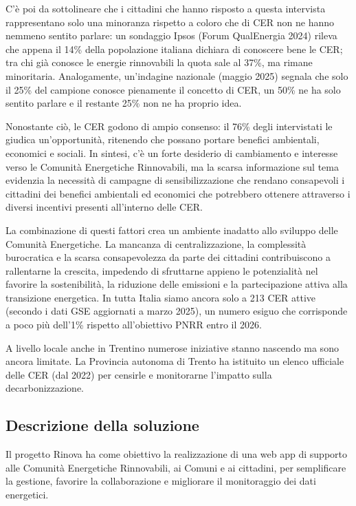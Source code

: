 C’è poi da sottolineare che i cittadini che hanno risposto a questa intervista rappresentano solo una minoranza rispetto a coloro che di CER non ne hanno nemmeno sentito parlare: un sondaggio Ipsos (Forum QualEnergia 2024) rileva che appena il 14\% della popolazione italiana dichiara di conoscere bene le CER; tra chi già conosce le energie rinnovabili la quota sale al 37\%, ma rimane minoritaria. Analogamente, un’indagine nazionale (maggio 2025) segnala che solo il 25\% del campione conosce pienamente il concetto di CER, un 50\% ne ha solo sentito parlare e il restante 25\% non ne ha proprio idea.

Nonostante ciò, le CER godono di ampio consenso: il 76\% degli intervistati le giudica un’opportunità, ritenendo che possano portare benefici ambientali, economici e sociali. In sintesi, c’è un forte desiderio di cambiamento e interesse verso le Comunità Energetiche Rinnovabili, ma la scarsa informazione sul tema evidenzia la necessità di campagne di sensibilizzazione che rendano consapevoli i cittadini dei benefici ambientali ed economici che potrebbero ottenere attraverso i diversi incentivi presenti all’interno delle CER.

La combinazione di questi fattori crea un ambiente inadatto allo sviluppo delle Comunità Energetiche. La mancanza di centralizzazione, la complessità burocratica e la scarsa consapevolezza da parte dei cittadini contribuiscono a rallentarne la crescita, impedendo di sfruttarne appieno le potenzialità nel favorire la sostenibilità, la riduzione delle emissioni e la partecipazione attiva alla transizione energetica. In tutta Italia siamo ancora solo a 213 CER attive (secondo i dati GSE aggiornati a marzo 2025), un numero esiguo che corrisponde a poco più dell’1\% rispetto all’obiettivo PNRR entro il 2026.

A livello locale anche in Trentino numerose iniziative stanno nascendo ma sono ancora limitate. La Provincia autonoma di Trento ha istituito un elenco ufficiale delle CER (dal 2022) per censirle e monitorarne l’impatto sulla decarbonizzazione.

\subsection{Descrizione della soluzione}
Il progetto Rinova ha come obiettivo la realizzazione di una web app di supporto alle Comunità Energetiche Rinnovabili, ai Comuni e ai cittadini, per semplificare la gestione, favorire la collaborazione e migliorare il monitoraggio dei dati energetici.


